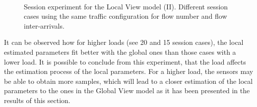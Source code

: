 \begin{figure}[h!]
	\centering
	\\
	\caption{Session experiment for the Local View model (II). Different session cases using the same traffic configuration for flow number and flow inter-arrivals.}
	\label{fig:lv_session_exp2}
\end{figure}

It can be observed how for higher loads (see 20 and 15 session cases), the local estimated parameters fit better with the global ones than those cases with a lower load. It is possible to conclude from this experiment, that the load affects the estimation process of the local parameters. For a higher load, the sensors may be able to obtain more samples, which will lead to a closer estimation of the local parameters to the ones in the Global View model as it has been presented in the results of this section.

